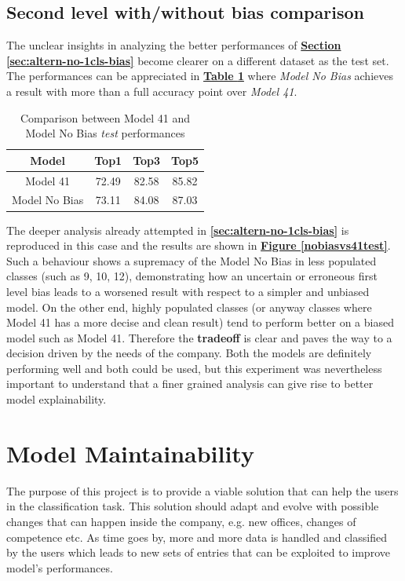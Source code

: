 \documentclass[12pt]{article}
\begin{document}
\subsection{Second level with/without bias comparison}
The unclear insights in analyzing the better performances of \hyperref[sec:altern-no-1cls-bias]{\textbf{Section \ref{sec:altern-no-1cls-bias}}} become clearer on a different dataset as the test set. The performances can be appreciated in \hyperref[tb:test-bias-nobias]{\textbf{Table \ref{tb:test-bias-nobias}}} where \textit{Model No Bias} achieves a result with more than a full accuracy point over \textit{Model 41}. 
\begin{table}[ht!]
    \begin{adjustwidth}{}{}
	    \centering
	    \small
	    \begin{tabular}{ |c|c|c|c| }
        \hline
        \textbf{Model} & \textbf{Top1} & \textbf{Top3} & \textbf{Top5}\\
        \hline
        Model 41 & 72.49 & 82.58 & 85.82\\
        Model No Bias & 73.11 & 84.08 & 87.03\\
        \hline
        \end{tabular}
    \end{adjustwidth}
    \captionsetup{justification   = centering}
    \caption{Comparison between Model 41 and Model No Bias \textit{test} performances}
    \label{tb:test-bias-nobias}
\end{table}

The deeper analysis already attempted in \textbf{\ref{sec:altern-no-1cls-bias}} is reproduced in this case and the results are shown in \hyperref[nobiasvs41test]{\textbf{Figure \ref{nobiasvs41test}}}.
Such a behaviour shows a supremacy of the Model No Bias in less populated classes (such as 9, 10, 12), demonstrating how an uncertain or erroneous first level bias leads to a worsened result with respect to a simpler and unbiased model. 
On the other end, highly populated classes (or anyway classes where Model 41 has a more decise and clean result) tend to perform better on a biased model such as Model 41. 
Therefore the \textbf{tradeoff} is clear and paves the way to a decision driven by the needs of the company. Both the models are definitely performing well and both could be used, but this experiment was nevertheless important to understand that a finer grained analysis can give rise to better model explainability.

\section{Model Maintainability}
The purpose of this project is to provide a viable solution that can help the users in the classification task. This solution should adapt and evolve with possible changes that can happen inside the company, e.g. new offices, changes of competence etc. As time goes by, more and more data is handled and classified by the users which leads to new sets of entries that can be exploited to improve model's performances.
\end{document}
